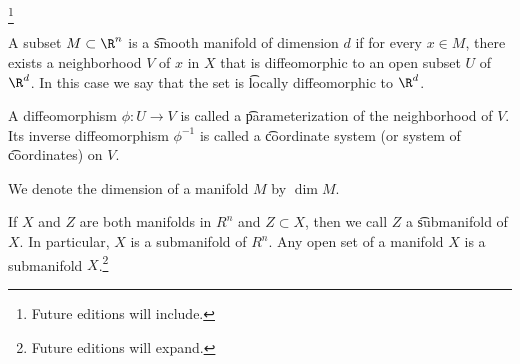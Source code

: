 
\footnote{Future editions will include.}


A subset $M \subset \R^n$ is a \t{smooth manifold} of dimension $d$ if for every $x \in M$, there exists a neighborhood $V$ of $x$ in $X$ that is diffeomorphic to an open subset $U$ of $\R^d$.
In this case we say that the set is \t{locally diffeomorphic} to $\R^d$.

A diffeomorphism $\phi: U \to V$ is called a \t{parameterization} of the neighborhood of $V$.
Its inverse diffeomorphism $\phi^{-1}$ is called a \t{coordinate system} (or system of \t{coordinates}) on $V$.


We denote the dimension of a manifold $M$ by $\dim M$.


If $X$ and $Z$ are both manifolds in $R^n$ and $Z \subset X$, then we call $Z$ a \t{submanifold} of $X$.
In particular, $X$ is a submanifold of $R^n$.
Any open set of a manifold $X$ is a submanifold $X$.\footnote{Future editions will expand.}


\blankpage
